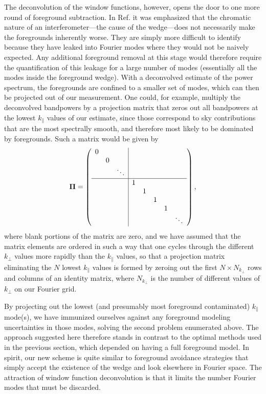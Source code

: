 \documentclass[twocolumn,aps,prd,nofootinbib,showpacs]{revtex4-1}
\begin{document}
The deconvolution of the window functions, however, opens the door to one more round of foreground subtraction.  In Ref. \cite{Shaw2014b} it was emphasized that the chromatic nature of an interferometer---the cause of the wedge---does not necessarily make the foregrounds inherently worse.  They are simply more difficult to identify because they have leaked into Fourier modes where they would not be naively expected.  Any additional foreground removal at this stage would therefore require the quantification of this leakage for a large number of modes (essentially all the modes inside the foreground wedge).  With a deconvolved estimate of the power spectrum, the foregrounds are confined to a smaller set of modes, which can then be projected out of our measurement.  One could, for example, multiply the deconvolved bandpowers by a projection matrix that zeros out all bandpowers at the lowest $k_\parallel$ values of our estimate, since those correspond to sky contributions that are the most spectrally smooth, and therefore most likely to be dominated by foregrounds.  Such a matrix would be given by
\begin{equation}
\boldsymbol \Pi = \left( \begin{array}{ccc|ccccc}
0&   & && & &&\\
& 0 && & &&&\\
    &  & \ddots & & &&&\\
  \hline
&  & &1&  &  & &  \\
&  & &  &1 & & &  \\
&  & &  &  &1 & &  \\
&  & & & &&1&\\
    &  & & & &&&\ddots\\
\end{array}
\right),
\end{equation}
where blank portions of the matrix are zero, and we have assumed that the matrix elements are ordered in such a way that one cycles through the different $k_\perp$ values more rapidly than the $k_\parallel$ values, so that a projection matrix eliminating the $N$ lowest $k_\parallel$ values is formed by zeroing out the first $N \times N_{k_\perp}$ rows and columns of an identity matrix, where $N_{k_\perp}$ is the number of different values of $k_\perp$ on our Fourier grid.

By projecting out the lowest (and presumably most foreground contaminated) $k_\parallel$ mode(s), we have immunized ourselves against any foreground modeling uncertainties in those modes, solving the second problem enumerated above.  The approach suggested here therefore stands in contrast to the optimal methods used in the previous section, which depended on having a full foreground model.  In spirit, our new scheme is quite similar to foreground avoidance strategies that simply accept the existence of the wedge and look elsewhere in Fourier space.  The attraction of window function deconvolution is that it limits the number Fourier modes that must be discarded.
\end{document}
